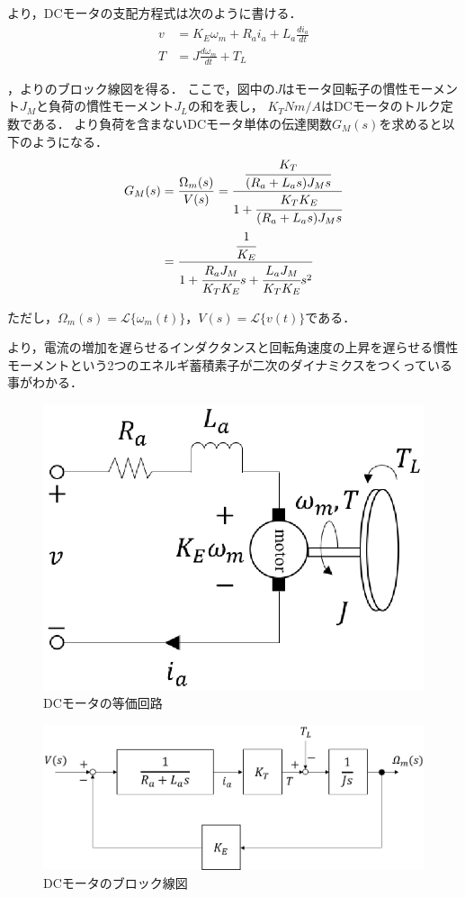 より，DCモータの支配方程式は次のように書ける．
\begin{align}
v &= K_{E}\omega_{m} + R_{a}i_{a} + L_{a}\frac{di_{a}}{dt} \label{eq::dcm_v} \\
T &= J\frac{d\omega_{m}}{dt} + T_{L} \label{eq::dcm_t}
\end{align}

，よりのブロック線図を得る．
ここで，図中の$J$はモータ回転子の慣性モーメント$J_{M}$と負荷の慣性モーメント$J_{L}$の和を表し，
$K_{T}\unit{Nm/A}$はDCモータのトルク定数である．
より負荷を含まないDCモータ単体の伝達関数$G_{M}(s)$を求めると以下のようになる．
\begin{align}
G_{M}(s) &= \frac{\Omega_{m}(s)}{V(s)} = 
\frac{\cfrac{K_{T}}{(R_{a} + L_{a}s)J_{M}s}}{1 + \cfrac{K_{T}K_{E}}{(R_{a} + L_{a}s)J_{M}s}} \nonumber \\
 &= \frac{\cfrac{1}{K_{E}}}{1 + \cfrac{R_{a}J_{M}}{K_{T}K_{E}}s + \cfrac{L_{a}J_{M}}{K_{T}K_{E}}s^2} \label{eq::dcm_tf}
\end{align}

ただし，$\Omega_{m}(s) = \mathcal{L}\{\omega_{m}(t)\}，V(s) = \mathcal{L}\{v(t)\}$である．

より，電流の増加を遅らせるインダクタンスと回転角速度の上昇を遅らせる慣性モーメントという2つのエネルギ蓄積素子が二次のダイナミクスをつくっている事がわかる．

\begin{figure}[htb]
  \centering
    \includegraphics[width=0.5\hsize]{picture/eps/dcm_circit.eps}
    \caption{DCモータの等価回路}
    \label{fig::dcm_circit}
\end{figure}

\begin{figure}[htb]
  \centering
    \includegraphics[width=1.0\hsize]{picture/eps/dcm_block_diagram.eps}
    \caption{DCモータのブロック線図}
    \label{fig::dcm_block}
\end{figure}


